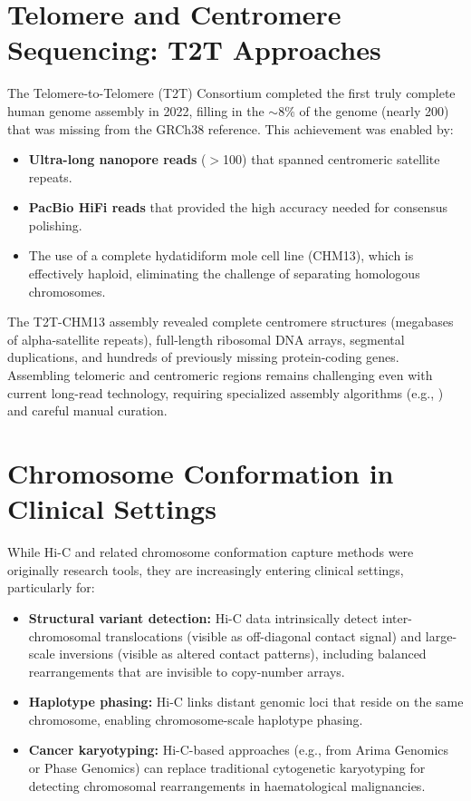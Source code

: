 \section{Telomere and Centromere Sequencing: T2T Approaches}
\label{sec:specialized:t2t}

The Telomere-to-Telomere (T2T) Consortium completed the first truly complete human genome assembly in 2022, filling in the $\sim$8\% of the genome (nearly 200\megabase{}) that was missing from the GRCh38 reference. This achievement was enabled by:

\begin{itemize}[itemsep=2pt]
  \item \textbf{Ultra-long nanopore reads} ($>$100\kilobase{}) that spanned centromeric satellite repeats.
  \item \textbf{PacBio HiFi reads} that provided the high accuracy needed for consensus polishing.
  \item The use of a complete hydatidiform mole cell line (CHM13), which is effectively haploid, eliminating the challenge of separating homologous chromosomes.
\end{itemize}

The T2T-CHM13 assembly revealed complete centromere structures (megabases of alpha-satellite repeats), full-length ribosomal DNA arrays, segmental duplications, and hundreds of previously missing protein-coding genes. Assembling telomeric and centromeric regions remains challenging even with current long-read technology, requiring specialized assembly algorithms (e.g., ) and careful manual curation.


\section{Chromosome Conformation in Clinical Settings}
\label{sec:specialized:clinical-hic}

While Hi-C and related chromosome conformation capture methods were originally research tools, they are increasingly entering clinical settings, particularly for:

\begin{itemize}[itemsep=2pt]
  \item \textbf{Structural variant detection:} Hi-C data intrinsically detect inter-chromosomal translocations (visible as off-diagonal contact signal) and large-scale inversions (visible as altered contact patterns), including balanced rearrangements that are invisible to copy-number arrays.
  \item \textbf{Haplotype phasing:} Hi-C links distant genomic loci that reside on the same chromosome, enabling chromosome-scale haplotype phasing.
  \item \textbf{Cancer karyotyping:} Hi-C-based approaches (e.g., from Arima Genomics or Phase Genomics) can replace traditional cytogenetic karyotyping for detecting chromosomal rearrangements in haematological malignancies.
\end{itemize}


